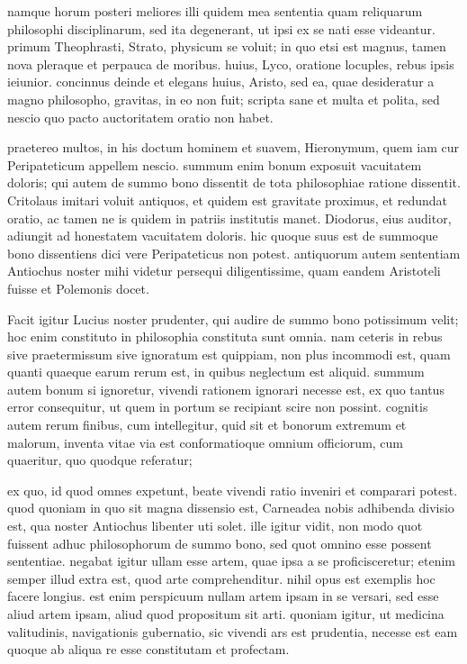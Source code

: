  namque horum posteri meliores illi quidem mea sententia quam reliquarum philosophi disciplinarum, sed ita degenerant, ut ipsi ex se nati esse videantur. primum Theophrasti, Strato, physicum se voluit; in quo etsi est magnus, tamen nova pleraque et perpauca de moribus. huius, Lyco, oratione locuples, rebus ipsis ieiunior. concinnus deinde et elegans huius, Aristo, sed ea, quae desideratur a magno philosopho, gravitas, in eo non fuit; scripta sane et multa et polita, sed nescio quo pacto auctoritatem oratio non habet.

 praetereo multos, in his doctum hominem et suavem, Hieronymum, quem iam cur Peripateticum appellem nescio. summum enim bonum exposuit vacuitatem doloris; qui autem de summo bono dissentit de tota philosophiae ratione dissentit. Critolaus imitari voluit antiquos, et quidem est gravitate proximus, et redundat oratio, ac tamen ne is quidem in patriis institutis manet. Diodorus, eius auditor, adiungit ad honestatem vacuitatem doloris. hic quoque suus est de summoque bono dissentiens dici vere Peripateticus non potest. antiquorum autem sententiam Antiochus noster mihi videtur persequi diligentissime, quam eandem Aristoteli fuisse et Polemonis docet.

 Facit igitur Lucius noster prudenter, qui audire de summo bono potissimum velit; hoc enim constituto in philosophia constituta sunt omnia. nam ceteris in rebus sive praetermissum sive ignoratum est quippiam, non plus incommodi est, quam quanti quaeque earum rerum est, in quibus neglectum est aliquid. summum autem bonum si ignoretur, vivendi rationem ignorari necesse est, ex quo tantus error consequitur, ut quem in portum se recipiant scire non possint. cognitis autem rerum finibus, cum intellegitur, quid sit et bonorum extremum et malorum, inventa vitae via est conformatioque omnium officiorum, cum quaeritur, quo quodque referatur;

 ex quo, id quod omnes expetunt, beate vivendi ratio inveniri et comparari potest. quod quoniam in quo sit magna dissensio est, Carneadea nobis adhibenda divisio est, qua noster Antiochus libenter uti solet. ille igitur vidit, non modo quot fuissent adhuc philosophorum de summo bono, sed quot omnino esse possent sententiae. negabat igitur ullam esse artem, quae ipsa a se proficisceretur; etenim semper illud extra est, quod arte comprehenditur. nihil opus est exemplis hoc facere longius. est enim perspicuum nullam artem ipsam in se versari, sed esse aliud artem ipsam, aliud quod propositum sit arti. quoniam igitur, ut medicina valitudinis, navigationis gubernatio, sic vivendi ars est prudentia, necesse est eam quoque ab aliqua re esse constitutam et profectam.

